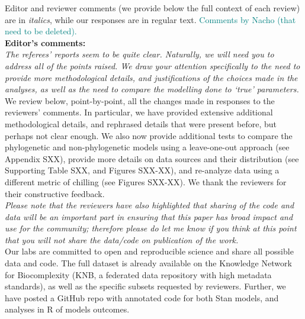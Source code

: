\documentclass[11pt]{article}
\begin{document}
Editor and reviewer comments (we provide below the full context of each review) are in \emph{italics}, while our responses are in regular text. 
\textcolor{teal}{Comments by Nacho (that need to be deleted).}
\\ %

{\bf Editor's comments:} \\


\emph{The referees’ reports seem to be quite clear. Naturally, we will need you to address all of the points raised. We draw your attention specifically to the need to provide more methodological details, and justifications of the choices made in the analyses, as well as the need to compare the modelling done to `true' parameters.}\\

We review below, point-by-point, all the changes made in responses to the reviewers' comments. In particular, we have provided extensive additional methodological details, and rephrased details that were present before, but perhaps not clear enough. We also now provide additional tests to compare the phylogenetic and non-phylogenetic models using a leave-one-out approach (see Appendix SXX), provide more details on data sources and their distribution (see Supporting Table SXX, and Figures SXX-XX), and re-analyze data using a different metric of chilling (see Figures SXX-XX). We thank the reviewers for their constructive feedback.\\

\emph{Please note that the reviewers have also highlighted that sharing of the code and data will be an important part in ensuring that this paper has broad impact and use for the community; therefore please do let me know if you think at this point that you will not share the data/code on publication of the work.}\\

Our labs are committed to open and reproducible science and share all possible data and code. The full dataset is already available on the Knowledge Network for Biocomplexity (KNB, a federated data repository with high metadata standards), as well as the specific subsets requested by reviewers. Further, we have posted a GitHub repo with annotated code for both Stan models, and analyses in R of models outcomes.\\
\end{document}
